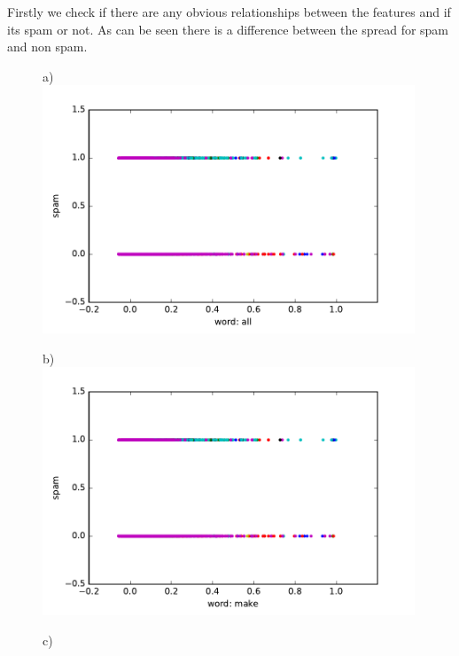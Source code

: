 \documentclass[10pt, paper=a4]{article}
\begin{document}
Firstly we check if there are any obvious relationships between the
features and if its spam or not. As can be seen there is a difference between the spread for spam
and non spam.

\begin{figure}[h]
  \begin{minipage}{0.3\textwidth}
    a)\\
    \includegraphics[width = 0.99\textwidth]{../../src/img/all_spam.pdf}
  \end{minipage} \hfill
  \begin{minipage}{0.3\textwidth}
    b)\\
    \includegraphics[width = 0.99\textwidth]{../../src/img/make_spam.pdf}
  \end{minipage} \hfill
  \begin{minipage}{0.3\textwidth}
    c)\\

\end{minipage}
\end{figure}
\end{document}
